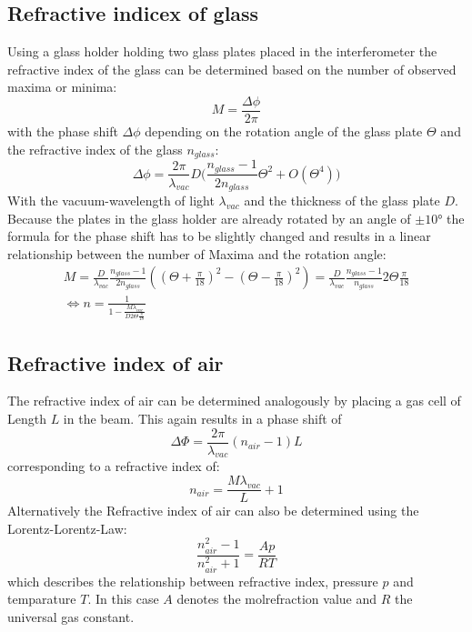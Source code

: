 \subsection{Refractive indicex of glass}
Using a glass holder holding two glass plates placed in the interferometer the refractive index of the glass can be determined based on the number of observed maxima or minima:
\begin{equation*}
M=\frac{\Delta \phi}{2\pi}
\end{equation*}
with the phase shift $\Delta \phi$ depending on the rotation angle of the glass plate $\Theta$ and the refractive index of the glass $n_{glass}$:
\begin{equation}
\Delta \phi=\frac{2\pi}{\lambda_{vac}}D\bigl( \frac{n_{glass}-1}{2n_{glass}}\Theta^2+O(\Theta^4)\bigr)
\end{equation}
With the vacuum-wavelength of light $\lambda_{vac}$ and the thickness of the glass plate $D$. Because the plates in the glass holder are already rotated by an angle of $\pm10°$ the formula for the phase shift has to be slightly changed and results in a linear relationship between the number of Maxima and the rotation angle:
\begin{gather}
M=\frac{D}{\lambda_{vac}}\frac{n_{glass}-1}{2n_{glass}}((\Theta+\frac{\pi}{18})^2-(\Theta-\frac{\pi}{18})^2)=\frac{D}{\lambda_{vac}}\frac{n_{glass}-1}{n_{glass}}2\Theta\frac{\pi}{18} \\
\iff n=\frac{1}{1-\frac{M\lambda_{vac}}{D2\Theta\frac{\pi}{18}}}
\end{gather}
\subsection{Refractive index of air}
The refractive index of air can be determined analogously by placing a gas cell of Length $L$ in the beam. This again results in a phase shift of
\begin{equation*}
\Delta \Phi=\frac{2\pi}{\lambda_{vac}}(n_{air}-1)L
\end{equation*}
corresponding to a refractive index of:
\begin{equation}
n_{air}=\frac{M\lambda_{vac}}{L}+1
\end{equation}
Alternatively the Refractive index of air can also be determined using the Lorentz-Lorentz-Law:
\begin{equation}
\frac{n_{air}^2-1}{n_{air}^2+1}=\frac{Ap}{RT}
\end{equation}
which describes the relationship between refractive index, pressure $p$ and temparature $T$. In this case $A$ denotes the molrefraction value and $R$ the universal gas constant.
\cite{sample}

